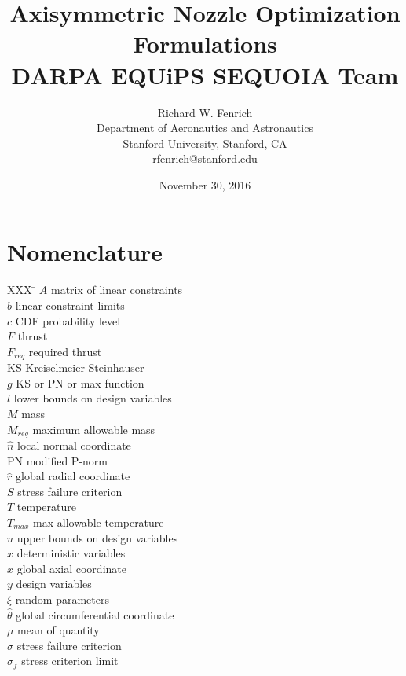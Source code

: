 \documentclass{article}
\title{Axisymmetric Nozzle Optimization Formulations\\DARPA EQUiPS SEQUOIA Team}
\author{Richard W. Fenrich\\Department of Aeronautics and Astronautics\\Stanford University, Stanford, CA\\rfenrich@stanford.edu}
\date{November 30, 2016}
\begin{document}
\maketitle

\tableofcontents

\listoftables


\section*{Nomenclature}

\begin{multicols}{2}
\begin{tabbing}
  XXX \= \kill%
  $A$ \> matrix of linear constraints \\
  $b$ \> linear constraint limits \\
  $c$ \> CDF probability level \\
  $F$ \> thrust \\
  $F_{req}$ \> required thrust \\
  KS \> Kreiselmeier-Steinhauser \\
  $g$ \> KS or PN or max function \\
  $l$ \> lower bounds on design variables \\
  $M$ \> mass \\
  $M_{req}$ \> maximum allowable mass \\
  $\hat{n}$ \> local normal coordinate \\
  PN \> modified P-norm \\ [\fill\columnbreak]
  $\hat{r}$ \> global radial coordinate \\
  $S$ \> stress failure criterion \\
  $T$ \> temperature \\
  $T_{max}$ \> max allowable temperature \\
  $u$ \> upper bounds on design variables \\
  $x$ \> deterministic variables \\
  $\hat{x}$ \> global axial coordinate \\
  $y$ \> design variables \\
  $\xi$ \> random parameters \\
  $\hat{\theta}$ \> global circumferential coordinate \\
  $\mu$ \> mean of quantity \\
  $\sigma$ \> stress failure criterion \\
  $\sigma_f$ \> stress criterion limit \\
 \end{tabbing}
\end{multicols}
\end{document}
